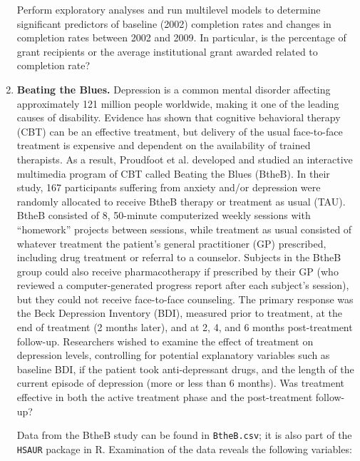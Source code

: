 \documentclass[
]{krantz}
\begin{document}
\begin{enumerate}
  Perform exploratory analyses and run multilevel models to determine significant predictors of baseline (2002) completion rates and changes in completion rates between 2002 and 2009. In particular, is the percentage of grant recipients or the average institutional grant awarded related to completion rate?
\item
  \textbf{Beating the Blues.} Depression is a common mental disorder affecting approximately 121 million people worldwide, making it one of the leading causes of disability. Evidence has shown that cognitive behavioral therapy (CBT) can be an effective treatment, but delivery of the usual face-to-face treatment is expensive and dependent on the availability of trained therapists. As a result, Proudfoot et al. \citeyearpar{Proudfoot2003} developed and studied an interactive multimedia program of CBT called Beating the Blues (BtheB). In their study, 167 participants suffering from anxiety and/or depression were randomly allocated to receive BtheB therapy or treatment as usual (TAU). BtheB consisted of 8, 50-minute computerized weekly sessions with ``homework'' projects between sessions, while treatment as usual consisted of whatever treatment the patient's general practitioner (GP) prescribed, including drug treatment or referral to a counselor. Subjects in the BtheB group could also receive pharmacotherapy if prescribed by their GP (who reviewed a computer-generated progress report after each subject's session), but they could not receive face-to-face counseling. The primary response was the Beck Depression Inventory (BDI), measured prior to treatment, at the end of treatment (2 months later), and at 2, 4, and 6 months post-treatment follow-up. Researchers wished to examine the effect of treatment on depression levels, controlling for potential explanatory variables such as baseline BDI, if the patient took anti-depressant drugs, and the length of the current episode of depression (more or less than 6 months). Was treatment effective in both the active treatment phase and the post-treatment follow-up?

  Data from the BtheB study can be found in \texttt{BtheB.csv}; it is also part of the \texttt{HSAUR} package \citep{Everitt2006} in R. Examination of the data reveals the following variables:


\end{enumerate}
\end{document}
